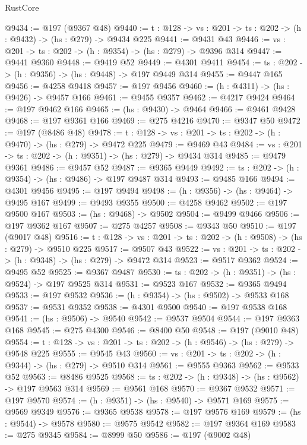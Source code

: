 \begin{lexlean}{RustCore}
\begin{coremodule}
@9434 := @197 (@9367 @48)
@9440 := {t : @128} -> {vs : @201} -> {ts : @202} -> (h : @9432) -> (hs : @279) -> @9434 @225
@9441 := @9431 @43
@9446 := {vs : @201} -> {ts : @202} -> (h : @9354) -> (hs : @279) -> @9396 @314
@9447 := @9441 @9360
@9448 := @9419 @52
@9449 := @4301 @9411
@9454 := {ts : @202} -> (h : @9356) -> (hs : @9448) -> @197 @9449 @314
@9455 := @9447 @165
@9456 := @4258 @9418
@9457 := @197 @9456
@9460 := (h : @4311) -> (hs : @9426) -> @9457 @166
@9461 := @9455 @9357
@9462 := @4217 @9424
@9464 := @197 @9462 @166
@9465 := (hs : @9430) -> @9464
@9466 := @9461 @9428
@9468 := @197 @9361 @166
@9469 := @275 @4216
@9470 := @9347 @50
@9472 := @197 (@8486 @48)
@9478 := {t : @128} -> {vs : @201} -> {ts : @202} -> (h : @9470) -> (hs : @279) -> @9472 @225
@9479 := @9469 @43
@9484 := {vs : @201} -> {ts : @202} -> (h : @9351) -> (hs : @279) -> @9434 @314
@9485 := @9479 @9361
@9486 := @9457 @52
@9487 := @9365 @9449
@9492 := {ts : @202} -> (h : @9354) -> (hs : @9486) -> @197 @9487 @314
@9493 := @9485 @166
@9494 := @4301 @9456
@9495 := @197 @9494
@9498 := (h : @9356) -> (hs : @9464) -> @9495 @167
@9499 := @9493 @9355
@9500 := @4258 @9462
@9502 := @197 @9500 @167
@9503 := (hs : @9468) -> @9502
@9504 := @9499 @9466
@9506 := @197 @9362 @167
@9507 := @275 @4257
@9508 := @9343 @50
@9510 := @197 (@9017 @48)
@9516 := {t : @128} -> {vs : @201} -> {ts : @202} -> (h : @9508) -> (hs : @279) -> @9510 @225
@9517 := @9507 @43
@9522 := {vs : @201} -> {ts : @202} -> (h : @9348) -> (hs : @279) -> @9472 @314
@9523 := @9517 @9362
@9524 := @9495 @52
@9525 := @9367 @9487
@9530 := {ts : @202} -> (h : @9351) -> (hs : @9524) -> @197 @9525 @314
@9531 := @9523 @167
@9532 := @9365 @9494
@9533 := @197 @9532
@9536 := (h : @9354) -> (hs : @9502) -> @9533 @168
@9537 := @9531 @9352
@9538 := @4301 @9500
@9540 := @197 @9538 @168
@9541 := (hs : @9506) -> @9540
@9542 := @9537 @9504
@9544 := @197 @9363 @168
@9545 := @275 @4300
@9546 := @8400 @50
@9548 := @197 (@9010 @48)
@9554 := {t : @128} -> {vs : @201} -> {ts : @202} -> (h : @9546) -> (hs : @279) -> @9548 @225
@9555 := @9545 @43
@9560 := {vs : @201} -> {ts : @202} -> (h : @9344) -> (hs : @279) -> @9510 @314
@9561 := @9555 @9363
@9562 := @9533 @52
@9563 := @8486 @9525
@9568 := {ts : @202} -> (h : @9348) -> (hs : @9562) -> @197 @9563 @314
@9569 := @9561 @168
@9570 := @9367 @9532
@9571 := @197 @9570
@9574 := (h : @9351) -> (hs : @9540) -> @9571 @169
@9575 := @9569 @9349
@9576 := @9365 @9538
@9578 := @197 @9576 @169
@9579 := (hs : @9544) -> @9578
@9580 := @9575 @9542
@9582 := @197 @9364 @169
@9583 := @275 @9345
@9584 := @8999 @50
@9586 := @197 (@9002 @48)

\end{coremodule}
\end{lexlean}
